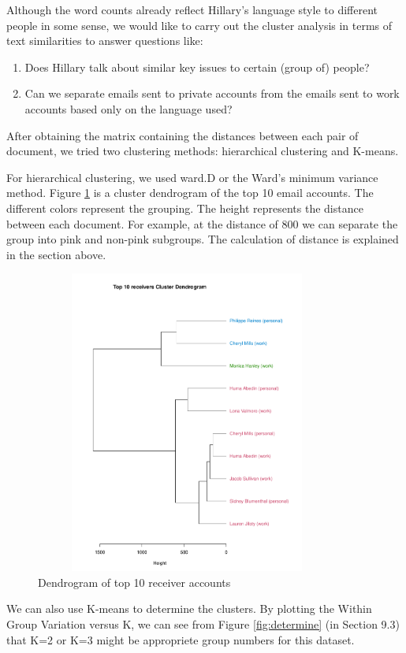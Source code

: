Although the word counts already reflect Hillary's language style to different people in some sense, we would like to carry out the cluster analysis in terms of text similarities to answer questions like: 
\begin{enumerate}
  \item Does Hillary talk about similar key issues to certain (group of) people?
  \item Can we separate emails sent to private accounts from the emails sent to work accounts based only on the language used?
\end{enumerate}

After obtaining the matrix containing the distances between each pair of document, we tried two clustering methods: hierarchical clustering and K-means. 

For hierarchical clustering, we used ward.D or the Ward's minimum variance method. Figure \ref{fig:dendr} is a cluster dendrogram of the top 10 email accounts. The different colors represent the grouping. The height represents the distance between each document. For example, at the distance of 800 we can separate the group into pink and non-pink subgroups. The calculation of distance is explained in the section above.
\begin{figure}[h!]
    \centering
    \includegraphics[width=10cm,height=10cm]
    {daitong_and_yihe/clusterp.pdf}
    \caption{Dendrogram of top 10 receiver accounts}
    \label{fig:dendr}
\end{figure}

We can also use K-means to determine the clusters. By plotting the Within Group Variation versus K, we can see from Figure \ref{fig:determine} (in Section 9.3) that K=2 or K=3 might be appropriete group numbers for this dataset.

